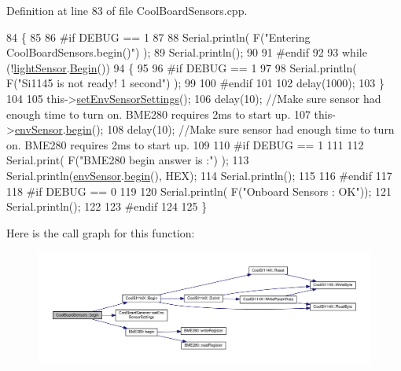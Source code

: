 Definition at line 83 of file Cool\+Board\+Sensors.\+cpp.


\begin{DoxyCode}
84 \{  
85 
86 \textcolor{preprocessor}{#if DEBUG == 1 }
87      
88     Serial.println( F(\textcolor{stringliteral}{"Entering CoolBoardSensors.begin()"}) );
89     Serial.println();
90 
91 \textcolor{preprocessor}{#endif}
92 
93     \textcolor{keywordflow}{while} (!\hyperlink{class_cool_board_sensors_ac711c27d0927eb5e73be77f092c48be0}{lightSensor}.\hyperlink{class_cool_s_i114_x_a206b36aca7049f63be1d11088c30a09f}{Begin}()) 
94     \{
95     
96 \textcolor{preprocessor}{    #if DEBUG == 1}
97 
98         Serial.println( F(\textcolor{stringliteral}{"Si1145 is not ready!  1 second"}) );
99 
100 \textcolor{preprocessor}{    #endif}
101 
102         delay(1000);
103     \}
104      
105     this->\hyperlink{class_cool_board_sensors_a406307ffd70272282d91479c7ed8d66f}{setEnvSensorSettings}();
106     delay(10);  \textcolor{comment}{//Make sure sensor had enough time to turn on. BME280 requires 2ms to start up.}
107     this->\hyperlink{class_cool_board_sensors_a868e38985e9a2412829fa2790ca13e2e}{envSensor}.\hyperlink{class_b_m_e280_a994c102f010547f9c740a338ef9905c7}{begin}();
108     delay(10);  \textcolor{comment}{//Make sure sensor had enough time to turn on. BME280 requires 2ms to start up.}
109 
110 \textcolor{preprocessor}{#if DEBUG == 1 }
111     
112     Serial.print( F(\textcolor{stringliteral}{"BME280 begin answer is :"}) );
113     Serial.println(\hyperlink{class_cool_board_sensors_a868e38985e9a2412829fa2790ca13e2e}{envSensor}.\hyperlink{class_b_m_e280_a994c102f010547f9c740a338ef9905c7}{begin}(), HEX);
114     Serial.println();
115 
116 \textcolor{preprocessor}{#endif}
117 
118 \textcolor{preprocessor}{#if DEBUG == 0}
119 
120     Serial.println( F(\textcolor{stringliteral}{"Onboard Sensors : OK"}));
121     Serial.println();
122 
123 \textcolor{preprocessor}{#endif}
124 
125 \}
\end{DoxyCode}
Here is the call graph for this function\+:\nopagebreak
\begin{figure}[H]
\begin{center}
\leavevmode
\includegraphics[width=350pt]{de/d46/class_cool_board_sensors_a97095823ef7c8f5290812f1405b966b3_cgraph}
\end{center}
\end{figure}
